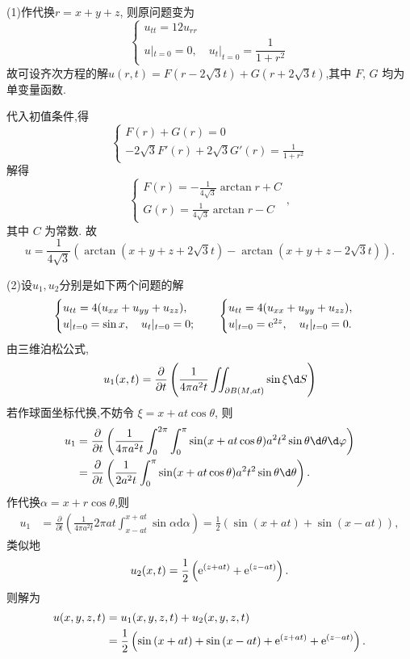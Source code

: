 \begin{solve}
	(1)作代换$r=x+y+z$, 则原问题变为
	\[\begin{cases}
		u_{tt}=12u_{rr}\\
		u|_{t=0}=0,\quad u_t|_{t=0}=\dfrac{1}{1+r^2}
	\end{cases}\]
	故可设齐次方程的解$u(r,t)=F(r-2\sqrt{3}t)+G(r+2\sqrt{3}t)$,其中 $F$, $G$ 均为单变量函数.
	
	代入初值条件,得
	\[\begin{cases}
		F(r)+G(r)=0\\
		-2\sqrt{3}F'(r)+2\sqrt{3}G'(r)=\frac{1}{1+r^2}
	\end{cases}\]
	解得
	\[\begin{cases}
		F(r)=-\frac{1}{4\sqrt{3}}\arctan r+C\\
		G(r)=\frac{1}{4\sqrt{3}}\arctan r-C
	\end{cases},\]
	其中 $C$ 为常数. 故
	$$u=\frac1{4\sqrt{3}}\left(\arctan{(x+y+z+2\sqrt{3}t)}-\arctan{(x+y+z-2\sqrt{3}t)}\right).$$
	
	(2)设$u_1,u_2$分别是如下两个问题的解
		\[\begin{cases}
			u_{tt}=4(u_{xx}+u_{yy}+u_{zz}),\\
			u|_{t=0}=\sin x,\quad u_{t}|_{t=0}=0;\end{cases}
		\quad
		\begin{cases}
			u_{tt}=4(u_{xx}+u_{yy}+u_{zz}),\\
			u|_{t=0}=\mathrm{e}^{2z},\quad u_{t}|_{t=0}=0.
		\end{cases}\]
	由三维泊松公式,
	\[u_1(x,t)=\frac{\partial}{\partial t}\left(\frac{1}{4\pi a^2t}\iint_{\partial B(M,at)}\sin\xi\d S\right)\]
	若作球面坐标代换,不妨令 $\xi=x+at\cos\theta$, 则
	\[\begin{aligned}
		u_1&={\frac{\partial}{\partial t}}\left({\frac{1}{4\pi a^{2}t}}\int_{0}^{2\pi}\int_{0}^{\pi}\sin(x+at\cos{\theta})a^2t^2\sin\theta\d\theta\d\varphi\right)\\
		&=\frac{\partial}{\partial t}\left(\frac{1}{2 a^{2}t}\int_{0}^{\pi}\sin(x+at\cos\theta)a^2t^2\sin\theta\d\theta\right).
	\end{aligned}\]
	作代换$\alpha=x+r\cos\theta$,则
	\[\begin{aligned}
		u_{1}& =\frac{\partial}{\partial t}\left(\frac{1}{4\pi a^{2}t}2\pi at\int_{x-at}^{x+at}\sin\alpha\mathrm{d}\alpha\right)=\frac{1}{2}\left(\sin\left(x+at\right)+\sin\left(x-at\right)\right),
		\end{aligned}\]
	类似地
	\[u_2(x,t)=\frac12\left(\mathrm{e}^{(z+at)}+\mathrm{e}^{(z-at)}\right).\]
	则解为
	\[\begin{aligned}
		u(x,y,z,t)&=u_{1}(x,y,z,t)+u_{2}(x,y,z,t) \\
		&=\frac12\left(\sin\left(x+at\right)+\sin\left(x-at\right)+\mathrm{e}^{\left(z+at\right)}+\mathrm{e}^{\left(z-at\right)}\right).
	\end{aligned}\]
\end{solve}
